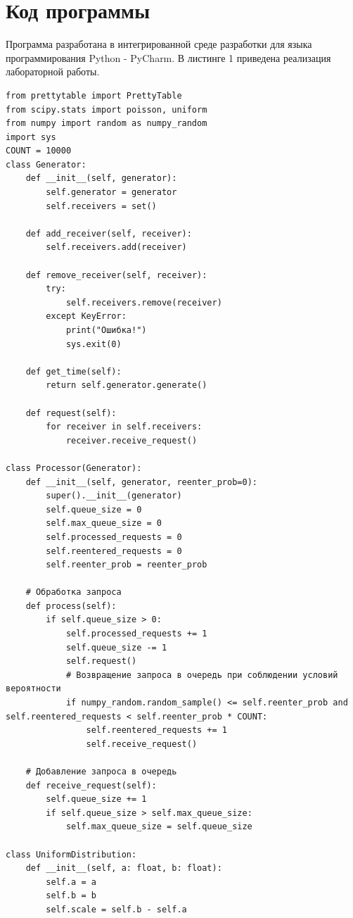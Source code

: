 \documentclass[14pt, a4paper]{extarticle}
\begin{document}
\section{Код программы}

Программа разработана в интегрированной среде разработки для языка программирования Python - PyCharm. 
В листинге 1 приведена реализация лабораторной работы.

\begin{lstlisting}[label=lst:list1]
from prettytable import PrettyTable
from scipy.stats import poisson, uniform
from numpy import random as numpy_random
import sys
COUNT = 10000
class Generator:
    def __init__(self, generator):
        self.generator = generator
        self.receivers = set()

    def add_receiver(self, receiver):
        self.receivers.add(receiver)

    def remove_receiver(self, receiver):
        try:
            self.receivers.remove(receiver)
        except KeyError:
            print("Ошибка!")
            sys.exit(0)

    def get_time(self):
        return self.generator.generate()

    def request(self):
        for receiver in self.receivers:
            receiver.receive_request()

class Processor(Generator):
    def __init__(self, generator, reenter_prob=0):
        super().__init__(generator)
        self.queue_size = 0
        self.max_queue_size = 0
        self.processed_requests = 0
        self.reentered_requests = 0
        self.reenter_prob = reenter_prob

    # Обработка запроса
    def process(self):
        if self.queue_size > 0:
            self.processed_requests += 1
            self.queue_size -= 1
            self.request()
            # Возвращение запроса в очередь при соблюдении условий вероятности
            if numpy_random.random_sample() <= self.reenter_prob and self.reentered_requests < self.reenter_prob * COUNT:
                self.reentered_requests += 1
                self.receive_request()

    # Добавление запроса в очередь
    def receive_request(self):
        self.queue_size += 1
        if self.queue_size > self.max_queue_size:
            self.max_queue_size = self.queue_size

class UniformDistribution:
    def __init__(self, a: float, b: float):
        self.a = a
        self.b = b
        self.scale = self.b - self.a


\end{lstlisting}
\end{document}

